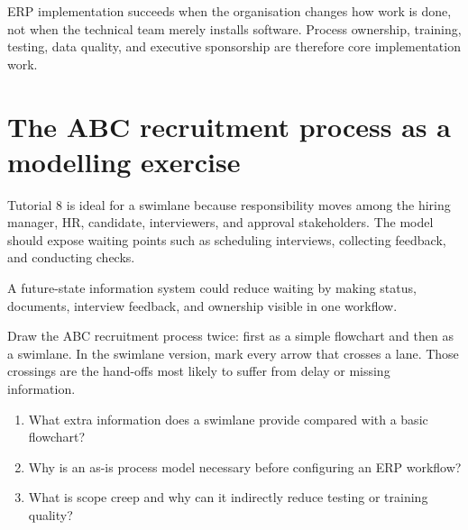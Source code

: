 \begin{keyidea}
ERP implementation succeeds when the organisation changes how work is done, not when the technical team merely installs software. Process ownership, training, testing, data quality, and executive sponsorship are therefore core implementation work.
\end{keyidea}

\section{The ABC recruitment process as a modelling exercise}

Tutorial 8 is ideal for a swimlane because responsibility moves among the hiring manager, HR, candidate, interviewers, and approval stakeholders. The model should expose waiting points such as scheduling interviews, collecting feedback, and conducting checks.

A future-state information system could reduce waiting by making status, documents, interview feedback, and ownership visible in one workflow.

\begin{tryit}
Draw the ABC recruitment process twice: first as a simple flowchart and then as a swimlane. In the swimlane version, mark every arrow that crosses a lane. Those crossings are the hand-offs most likely to suffer from delay or missing information.
\end{tryit}

\begin{quickcheck}
\begin{enumerate}
  \item What extra information does a swimlane provide compared with a basic flowchart?
  \item Why is an as-is process model necessary before configuring an ERP workflow?
  \item What is scope creep and why can it indirectly reduce testing or training quality?
\end{enumerate}
\end{quickcheck}
